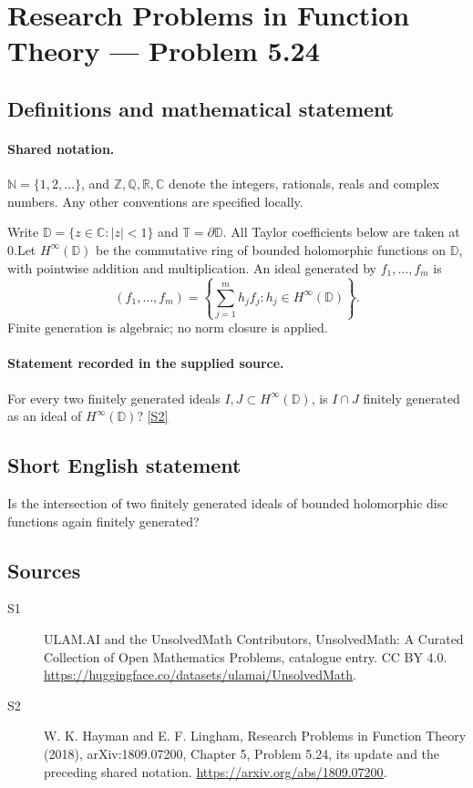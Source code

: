 \documentclass[11pt]{article}
\newcommand{\sref}[2]{\hyperlink{source:#1:#2}{[S#2]}}
\begin{document}
\section{Research Problems in Function Theory — Problem 5.24}\label{statement}

\subsection{Definitions and mathematical statement}

\paragraph{Shared notation.}$\mathbb N=\{1,2,\ldots\}$, and $\mathbb Z,\mathbb Q,\mathbb R,\mathbb C$ denote the integers, rationals, reals and complex numbers. Any other conventions are specified locally.


Write $\mathbb D=\{z\in\mathbb C:|z|<1\}$ and $\mathbb T=\partial\mathbb D$. All Taylor coefficients below are taken at $0$.Let $H^\infty(\mathbb D)$ be the commutative ring of bounded holomorphic functions on $\mathbb D$, with pointwise addition and multiplication. An ideal generated by $f_1,\ldots,f_m$ is
\[(f_1,\ldots,f_m)=\left\{\sum_{j=1}^m h_j f_j:h_j\in H^\infty(\mathbb D)\right\}.
\]
Finite generation is algebraic; no norm closure is applied.
\paragraph{Statement recorded in the supplied source.}
For every two finitely generated ideals $I,J\subset H^\infty(\mathbb D)$, is $I\cap J$ finitely generated as an ideal of $H^\infty(\mathbb D)$? \sref{statement}{2}
\subsection{Short English statement}
Is the intersection of two finitely generated ideals of bounded holomorphic disc functions again finitely generated?
\subsection{Sources}
\begin{description}
\item[\hypertarget{source:statement:1}{S1}] ULAM.AI and the UnsolvedMath Contributors, UnsolvedMath: A Curated Collection of Open Mathematics Problems, catalogue entry. CC BY 4.0. \url{https://huggingface.co/datasets/ulamai/UnsolvedMath}.
\item[\hypertarget{source:statement:2}{S2}] W. K. Hayman and E. F. Lingham, Research Problems in Function Theory (2018), arXiv:1809.07200, Chapter 5, Problem 5.24, its update and the preceding shared notation. \url{https://arxiv.org/abs/1809.07200}.
\end{description}
\label{end:statement}
\end{document}
